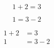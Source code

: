 \documentclass{article}
\begin{document}
	\begin{equation*}
		1 + 2 = 3
	\end{equation*}

	\begin{equation*}
		1 = 3 - 2
	\end{equation*}

	\begin{align*}
		1 + 2 &= 3 \\
		1 &= 3 -2
	\end{align*}
\end{document}
